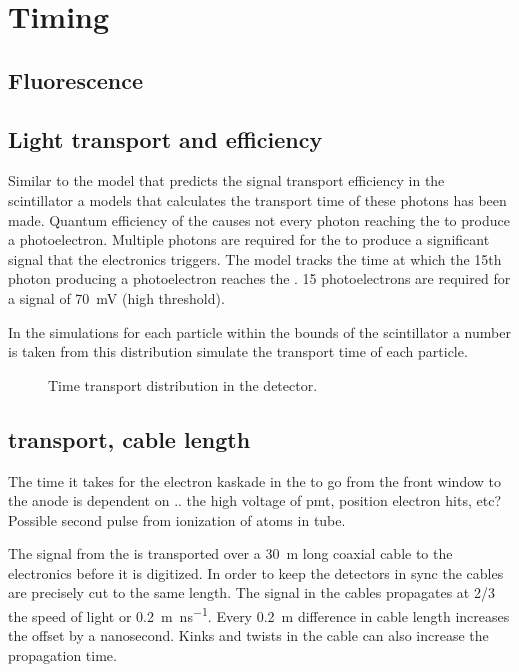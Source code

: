 \section{Timing}


\subsection{Fluorescence}



\subsection{Light transport and \pmt efficiency}

Similar to the model that predicts the signal transport efficiency in
the scintillator a models that calculates the transport time of these
photons has been made. Quantum efficiency of the \pmt causes not every
photon reaching the \pmt to produce a photoelectron. Multiple photons
are required for the \pmt to produce a significant signal that the
\hisparc electronics triggers. The model tracks the time at which the
15th photon producing a photoelectron reaches the \pmt. 15
photoelectrons are required for a signal of \SI{70}{\milli\volt} (high
threshold).

In the simulations for each particle within the bounds of the
scintillator a number is taken from this distribution simulate the
transport time of each particle.

\begin{figure}
    \centering
    
    \caption{ Time transport
             distribution in the detector.}
    \label{fig:transport_time}
\end{figure}


\subsection{\pmt transport, cable length}

The time it takes for the electron kaskade in the \pmt to go from the
front window to the anode is dependent on .. the high voltage of pmt,
position electron hits, etc? Possible second pulse from ionization of
atoms in tube.

The signal from the \pmt is transported over a \SI{30}{\meter} long
coaxial cable to the \hisparc electronics before it is digitized. In
order to keep the detectors in sync the cables are precisely cut to the
same length. The signal in the cables propagates at 2/3 the speed of
light or \SI{.2}{\meter\per\nano\second}. Every \SI{.2}{\meter}
difference in cable length increases the offset by a nanosecond. Kinks
and twists in the cable can also increase the propagation time.


